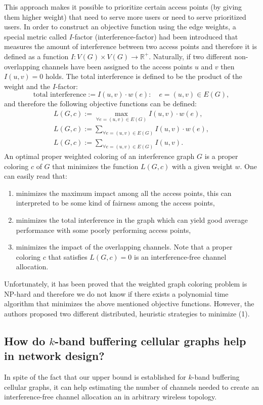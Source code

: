 \documentclass[a4paper, 12pt]{article}
\begin{document}
This approach makes it possible to prioritize certain access points (by giving them higher weight) that need to serve more users or need to serve prioritized users. In order to construct an objective function using the edge weights, a special metric called $I$-factor (interference-factor) had been introduced that measures the amount of interference between two access points and therefore it is defined as a function $I\colon V(G) \times V(G) \to \mathbb{R}^+$. Naturally, if two different non-overlapping channels have been assigned to the access points $u$ and $v$ then $I(u,v)=0$ holds. The total interference is defined to be the product of the weight and the $I$-factor:
$$
\text{total interference}:=I(u,v) \cdot w(e): \quad e=(u,v) \in E(G),
$$
and therefore the following objective functions can be defined:
\begin{gather}
L(G,c) := \max_{\forall e = (u,v) \in E(G)}I(u,v) \cdot w(e), \\
L(G,c) := \sum_{\forall e = (u,v) \in E(G)}I(u,v) \cdot w(e), \\
L(G,c) := \sum_{\forall e = (u,v) \in E(G)}I(u,v).
\end{gather}
An optimal proper weighted coloring of an interference graph $G$ is a proper coloring $c$ of $G$ that minimizes the function $L(G,c)$ with a given weight $w$. One can easily read that:
\begin{enumerate}[(1)]
\item minimizes the maximum impact among all the access points, this can interpreted to be some kind of fairness among the access points,
\item minimizes the total interference in the graph which can yield good average performance with some poorly performing access points,
\item minimizes the impact of the overlapping channels. Note that a proper coloring $c$ that satisfies $L(G,c)=0$ is an interference-free channel allocation.
\end{enumerate}
Unfortunately, it has been proved that the weighted graph coloring problem is NP-hard and therefore we do not know if there exists a polynomial time algorithm that minimizes the above mentioned objective functions. However, the authors proposed two different distributed, heuristic strategies to minimize (1).

\subsection{How do $k$-band buffering cellular graphs help in network design?}
In spite of the fact that our upper bound is established for $k$-band buffering cellular graphs, it can help estimating the number of channels needed to create an interference-free channel allocation an in arbitrary wireless topology. 
\end{document}
